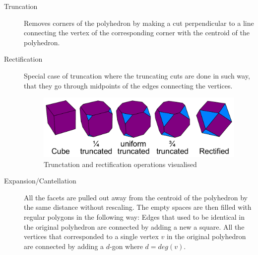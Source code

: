 \begin{description}
    \item[Truncation] Removes corners of the polyhedron by making a cut perpendicular to a line connecting the vertex of the corresponding corner with the centroid of the polyhedron.
    \item[Rectification] Special case of truncation where the truncating cuts are done in such way, that they go through midpoints of the edges connecting the vertices. 
    \begin{figure}[H]
        \centering
        \includegraphics[width=1\textwidth]{../Resources/Figs/truncation.pdf}
        \caption{Trunctation and rectification operations visualised \cite{wikimedia-cube-truncation}}
        \label{fig:op_truncation}
    \end{figure}
    \item[Expansion/Cantellation] All the facets are pulled out away from the centroid of the polyhedron by the same distance without rescaling. The empty spaces are then filled with regular polygons in the following way: Edges that used to be identical in the original polyhedron are connected by adding a new a square. All the vertices that corresponded to a single vertex $v$ in the original polyhedron are connected by adding a $d$-gon where $d=deg(v)$.


\end{description}
